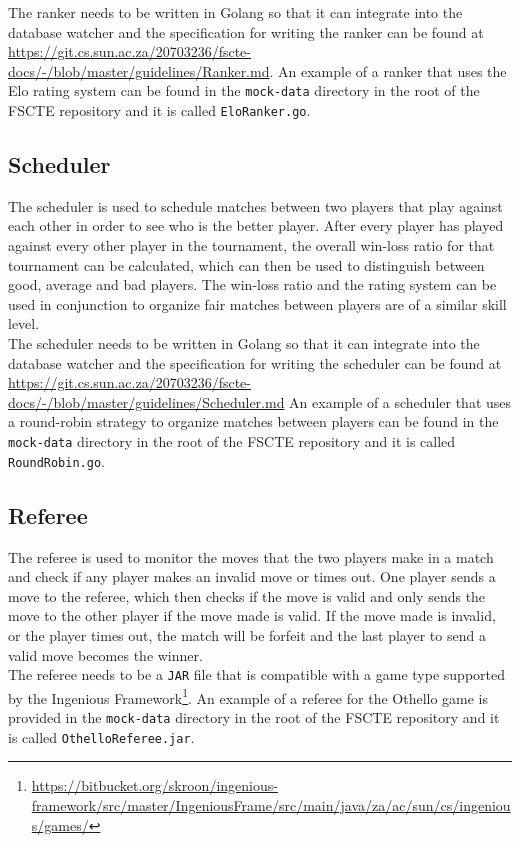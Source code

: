 \documentclass[a4paper, 12pt]{report}
\begin{document}
The ranker needs to be written in Golang so that it can integrate into the database
watcher and the specification for writing the ranker can be found at
\url{https://git.cs.sun.ac.za/20703236/fscte-docs/-/blob/master/guidelines/Ranker.md}.
An example of a ranker that uses the Elo \cite{elo} rating system can be found in
the \texttt{mock-data} directory in the root of the FSCTE repository and it is
called \texttt{EloRanker.go}.

\subsection{Scheduler}
\label{sec:scheduler}

The scheduler is used to schedule matches between two players that play against
each other in order to see who is the better player. After every player
has played against every other player in the tournament, the overall win-loss
ratio for that tournament can be calculated, which can then be used to
distinguish between good, average and bad players. The win-loss ratio and the
rating system can be used in conjunction to organize fair matches between players
are of a similar skill level. \\

The scheduler needs to be written in Golang so that it can integrate into the
database watcher and the specification for writing the scheduler can be found at
\url{https://git.cs.sun.ac.za/20703236/fscte-docs/-/blob/master/guidelines/Scheduler.md}
An example of a scheduler that uses a round-robin strategy to organize matches
between players can be found in the \texttt{mock-data} directory in the root of
the FSCTE repository and it is called \texttt{RoundRobin.go}.

\subsection{Referee}
\label{sec:referee}

The referee is used to monitor the moves that the two players make in a match and
check if any player makes an invalid move or times out. One player sends a
move to the referee, which then checks if the move is valid and only sends
the move to the other player if the move made is valid. If the move made is
invalid, or the player times out, the match will be forfeit and the last player
to send a valid move becomes the winner. \\

The referee needs to be a \texttt{JAR} file that is compatible with a game type
supported by the Ingenious
Framework\footnote{\url{https://bitbucket.org/skroon/ingenious-framework/src/master/IngeniousFrame/src/main/java/za/ac/sun/cs/ingenious/games/}}.
An example of a referee for the Othello game is provided in the \texttt{mock-data}
directory in the root of the FSCTE repository and it is called \texttt{OthelloReferee.jar}.
\end{document}
